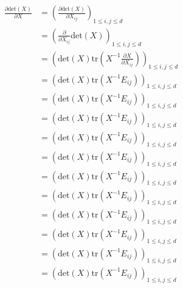 \documentclass[12pt,a4paper]{article}
\begin{document}
\begin{align*}
    \frac{\partial \text{det}(X)}{\partial X} &= \left(\frac{\partial \text{det}(X)}{\partial X_{ij}}\right)_{1\leq i,j\leq d} \\
    &= \left(\frac{\partial}{\partial X_{ij}}\text{det}(X)\right)_{1\leq i,j\leq d} \\
    &= \left(\text{det}(X) \text{tr}\left(X^{-1} \frac{\partial X}{\partial X_{ij}}\right)\right)_{1\leq i,j\leq d} \\
    &= \left(\text{det}(X) \text{tr}\left(X^{-1} E_{ij}\right)\right)_{1\leq i,j\leq d} \\
    &= \left(\text{det}(X) \text{tr}\left(X^{-1} E_{ij}\right)\right)_{1\leq i,j\leq d} \\
    &= \left(\text{det}(X) \text{tr}\left(X^{-1} E_{ij}\right)\right)_{1\leq i,j\leq d} \\
    &= \left(\text{det}(X) \text{tr}\left(X^{-1} E_{ij}\right)\right)_{1\leq i,j\leq d} \\
    &= \left(\text{det}(X) \text{tr}\left(X^{-1} E_{ij}\right)\right)_{1\leq i,j\leq d} \\
    &= \left(\text{det}(X) \text{tr}\left(X^{-1} E_{ij}\right)\right)_{1\leq i,j\leq d} \\
    &= \left(\text{det}(X) \text{tr}\left(X^{-1} E_{ij}\right)\right)_{1\leq i,j\leq d} \\
    &= \left(\text{det}(X) \text{tr}\left(X^{-1} E_{ij}\right)\right)_{1\leq i,j\leq d} \\
    &= \left(\text{det}(X) \text{tr}\left
    (X^{-1} E_{ij}\right)\right)_{1\leq i,j\leq d} \\
    &= \left(\text{det}(X) \text{tr}\left(X^{-1} E_{ij}\right)\right)_{1\leq i,j\leq d} \\
    &= \left(\text{det}(X) \text{tr}\left(X^{-1} E_{ij}\right)\right)_{1\leq i,j\leq d} \\
\end{align*}
\end{document}
